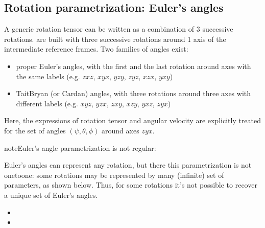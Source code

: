 \documentclass[letterpaper,10pt,english]{jupyterBook}
\begin{document}
\sphinxstepscope


\subsection{Rotation parametrization: Euler’s angles}
\label{\detokenize{ch/kinematics-rotations-param-euler:rotation-parametrization-euler-s-angles}}\label{\detokenize{ch/kinematics-rotations-param-euler:classical-mechanics-kinematics-rotations-euler}}\label{\detokenize{ch/kinematics-rotations-param-euler::doc}}
\sphinxAtStartPar
A generic rotation tensor can be written as a combination of 3 successive rotations.  are built with three successive rotations around 1 axis of the intermediate reference frames. Two families of angles exist:
\begin{itemize}
\item {} 
\sphinxAtStartPar
proper Euler’s angles, with the first and the last rotation around axes with the same labels (e.g. \(zxz\), \(xyx\), \(yzy\), \(zyz\), \(xzx\), \(yxy\))

\item {} 
\sphinxAtStartPar
Tait\sphinxhyphen{}Bryan (or Cardan) angles, with three rotations around three axes with different labels (e.g. \(xyz\), \(yzx\), \(zxy\), \(xzy\), \(yxz\), \(zyx\))

\end{itemize}

\sphinxAtStartPar
Here, the expressions of rotation tensor and angular velocity are explicitly treated for the set of angles \((\psi, \theta, \phi)\) around axes \(zyx\).

\begin{sphinxadmonition}{note}{Euler’s angle parametrization is not regular: }

\sphinxAtStartPar
Euler’s angles can represent any rotation, but there this parametrization is not one\sphinxhyphen{}to\sphinxhyphen{}one: some rotations may be represented by many (infinite) set of parameters, as shown below. Thus, for some rotations it’s not possible to recover a unique set of Euler’s angles.

\sphinxAtStartPar
{}
\begin{itemize}
\item {} 
\sphinxAtStartPar
{}

\item {} 
\sphinxAtStartPar
{}

\end{itemize}
\end{sphinxadmonition}
\end{document}
